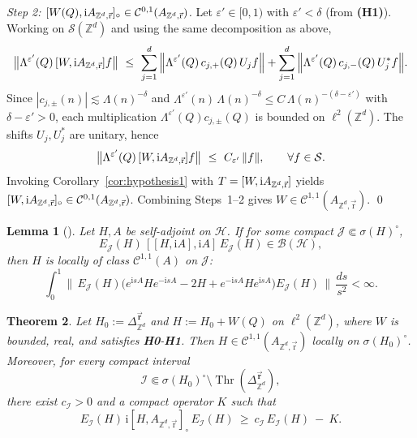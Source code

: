 \documentclass[10pt]{amsart} %
\newcommand{\Z}{{\mathbb{Z}}}
\newcommand{\1}{{\mathbb{I}}}
\newcommand{\Cc}{\mathcal{C}}
\newcommand{\Sc}{\mathcal{S}}
\newcommand{\Thr}{\operatorname{Thr}}
\numberwithin{equation}{section}
\def\rmi{{\rm i}}
\newtheorem{theorem}{Theorem}[section]%
\newtheorem{lemma}[theorem]{Lemma}%
\begin{document}
\emph{Step 2: $[W(Q),\rmi A_{\Z^d,\vec{\mathrm r}}]_{\circ}\in \Cc^{0,1}(A_{\Z^d,\vec{\mathrm r}})$.}
Let $\varepsilon'\in[0,1)$ with $\varepsilon'<\delta$ (from \textbf{(H1)}). Working on $\Sc(\Z^d)$ and using the
same decomposition as above,
\[
\big\|\Lambda^{\varepsilon'}(Q)\,[W,\rmi A_{\Z^d,\vec{\mathrm r}}]f\big\|
\ \le\ \sum_{j=1}^d \Big\|
\Lambda^{\varepsilon'}(Q)\,c_{j,+}(Q)\,U_j f\Big\|
+\sum_{j=1}^d \Big\|\Lambda^{\varepsilon'}(Q)\,c_{j,-}(Q)\,U_j^* f\Big\|.
\]
Since $|c_{j,\pm}(n)|\lesssim \Lambda(n)^{-\delta}$ and
$\Lambda^{\varepsilon'}(n)\,\Lambda(n)^{-\delta}\le C\,\Lambda(n)^{-(\delta-\varepsilon')}$ with
$\delta-\varepsilon'>0$, each multiplication $\Lambda^{\varepsilon'}(Q)c_{j,\pm}(Q)$ is bounded on
$\ell^2(\Z^d)$. The shifts $U_j, U_j^*$ are unitary, hence
\[
\big\|\Lambda^{\varepsilon'}(Q)\,[W,\rmi A_{\Z^d,\vec{\mathrm r}}]f\big\|
\ \le\ C_{\varepsilon'}\,\|f\|,\qquad \forall f\in\Sc.
\]
Invoking Corollary~\ref{cor:hypothesis1} with $T=[W,\rmi A_{\Z^d,\vec{\mathrm r}}]$ yields
$[W,\rmi A_{\Z^d,\vec{\mathrm r}}]_{\circ}\in \Cc^{0,1}(A_{\Z^d,\vec{\mathrm r}})$.
Combining Steps~1--2 gives $W\in \Cc^{1,1}(A_{\Z^d,\vec{\mathrm r}})$.
\qed


\begin{lemma}[\cite{ABG,GJ1}]\label{lem:C2loc_implies_C11loc}
Let $H,A$ be self-adjoint on $\mathcal{H}$. If for some compact $\mathcal{J}\Subset\sigma(H)^\circ$,
\[
E_\mathcal{J}(H)\,[[H,\mathrm{i}A],\mathrm{i}A]\,E_\mathcal{J}(H)\in\mathcal{B}(\mathcal{H}),
\]
then $H$ is locally of class $\mathcal{C}^{1,1}(A)$ on $\mathcal{J}$:
\[
\int_0^1 \Big\|\, E_\mathcal{J}(H)\Big(e^{\mathrm{i}sA}He^{-\mathrm{i}sA}-2H+e^{-\mathrm{i}sA}He^{\mathrm{i}sA}\Big)E_\mathcal{J}(H)\,\Big\|\,
\frac{ds}{s^2}<\infty.
\]
\end{lemma}

\begin{theorem}\label{thm:mou}
Let $H_0:=\Delta_{\mathbb{Z}^d}^{\vec{\mathbf{r}}}$ and $H:=H_0+W(Q)$ on $\ell^2(\mathbb{Z}^d)$, where $W$ is bounded, real, and satisfies \textbf{H0}-\textbf{H1}.
Then $H\in \mathcal{C}^{1,1}(A_{\mathbb{Z}^d,\vec{\mathrm{r}}})$ locally on $\sigma(H_0)^\circ$.
Moreover, for every compact interval
\[
\mathcal{I}\Subset\sigma(H_0)^\circ\setminus\Thr(\Delta_{\mathbb{Z}^d}^{\vec{\mathbf{r}}}),
\]
there exist $c_{\mathcal{I}}>0$ and a compact operator $K$ such that
\begin{equation}\label{eq:pert-mourre-Zd}
E_{\mathcal{I}}(H)\,\mathrm{i}[H,A_{\mathbb{Z}^d,\vec{\mathrm{r}}}]_\circ\,E_{\mathcal{I}}(H)\ \ge\ c_{\mathcal{I}}\,E_{\mathcal{I}}(H)\ -\ K .
\end{equation}
\end{theorem}
\end{document}
